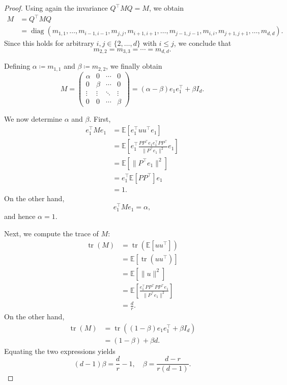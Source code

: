 \documentclass[10pt,a4paper]{amsart}
\DeclareMathOperator{\diag}{diag}
\begin{document}
\begin{proof}
Using again the invariance $Q^\top M Q=M$, we obtain
\begin{align*}
M
&= Q^\top M Q \\
&= \diag(
m_{1,1},\dots,m_{i-1,i-1},
m_{j,j},
m_{i+1,i+1},\dots,m_{j-1,j-1},
m_{i,i},
m_{j+1,j+1},\dots,m_{d,d}
).
\end{align*}
Since this holds for arbitrary $i,j \in \{2,\dots,d\}$ with $i \le j$, we conclude
that
\[
m_{2,2}=m_{3,3}=\cdots=m_{d,d}.
\]

Defining $\alpha \coloneqq m_{1,1}$ and $\beta \coloneqq m_{2,2}$, we finally
obtain
\[
M=
\begin{pmatrix}
\alpha & 0 & \cdots & 0 \\
0 & \beta & \cdots & 0 \\
\vdots & \vdots & \ddots & \vdots \\
0 & 0 & \cdots & \beta
\end{pmatrix}
= (\alpha-\beta)e_1e_1^\top + \beta I_d.
\]

We now determine $\alpha$ and $\beta$.
First,
\begin{align*}
e_1^\top M e_1
&= \mathbb{E}[e_1^\top uu^\top e_1] \\
&= \mathbb{E}\!\left[e_1^\top \frac{PP^\top e_1 e_1^\top PP^\top}{\|P^\top e_1\|^2} e_1\right] \\
&= \mathbb{E}[\|P^\top e_1\|^2] \\
&= e_1^\top \mathbb{E}[PP^\top] e_1 \\
&= 1.
\end{align*}
On the other hand,
\[
e_1^\top M e_1 = \alpha,
\]
and hence $\alpha=1$.

Next, we compute the trace of $M$:
\begin{align*}
\operatorname{tr}(M)
&= \operatorname{tr}(\mathbb{E}[uu^\top]) \\
&= \mathbb{E}[\operatorname{tr}(uu^\top)] \\
&= \mathbb{E}[\|u\|^2] \\
&= \mathbb{E}\!\left[\frac{e_1^\top PP^\top PP^\top e_1}{\|P^\top e_1\|^2}\right] \\
&= \frac{d}{r}.
\end{align*}
On the other hand,
\begin{align*}
\operatorname{tr}(M)
&= \operatorname{tr}((1-\beta)e_1e_1^\top + \beta I_d) \\
&= (1-\beta) + \beta d.
\end{align*}
Equating the two expressions yields
\[
(d-1)\beta = \frac{d}{r} - 1,
\quad
\beta = \frac{d-r}{r(d-1)}.
\]


\end{proof}
\end{document}
